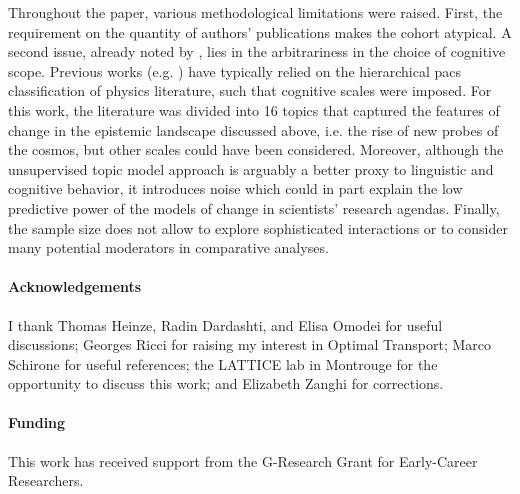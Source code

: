 \documentclass{article}
\begin{document}

Throughout the paper, various methodological limitations were raised. First, the requirement on the quantity of authors' publications makes the cohort atypical. A second issue, already noted by \citet{Gieryn1978}, lies in the arbitrariness in the choice of cognitive scope. Previous works (e.g. \citealt{Jia2017,Aleta2019,Tripodi2020}) have typically relied on the hierarchical \gls{pacs} classification of physics literature, such that cognitive scales were imposed. For this work, the literature was divided into 16 topics that captured the features of change in the epistemic landscape discussed above, i.e. the rise of new probes of the cosmos, but other scales could have been considered. %
Moreover, although the unsupervised topic model approach is arguably a better proxy to linguistic and cognitive behavior, it introduces noise which could in part explain the low predictive power of the models of change in scientists' research agendas. Finally, the sample size does not allow to explore sophisticated interactions or to consider many potential moderators in comparative analyses.

\paragraph{Acknowledgements}{I thank Thomas Heinze, Radin Dardashti, and Elisa Omodei for useful discussions; Georges Ricci for raising my interest in Optimal Transport; Marco Schirone for useful references; the LATTICE lab in Montrouge for the opportunity to discuss this work; and Elizabeth Zanghi for corrections.}



\paragraph{Funding}{This work has received support from the G-Research Grant for Early-Career Researchers.}
\end{document}
